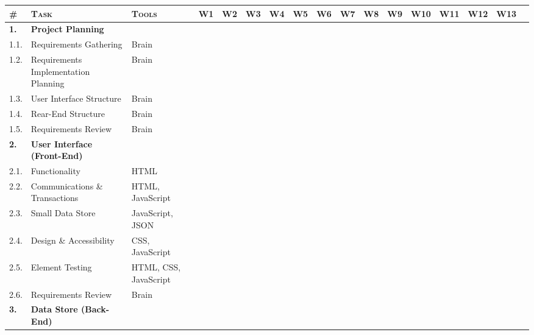 \documentclass[11pt, english]{article}
\begin{document}
\begin{landscape}

	\begin{table}[h]
		\tiny
		\renewcommand{\arraystretch}{1.25}
	\begin{center}
	\begin{tabular}{lll|cccccccccccccc}
		\textsc{\#} & \textsc{Task} & \textsc{Tools} & \textsc{W1} & \textsc{W2} & \textsc{W3} & \textsc{W4} & \textsc{W5} & \textsc{W6} & \textsc{W7} & \textsc{W8} & \textsc{W9} & \textsc{W10} & \textsc{W11} & \textsc{W12} & \textsc{W13}\\
		\hline
		\textbf{1.} & \textbf{Project Planning} &\\
		1.1. & Requirements Gathering & Brain & \cellcolor[gray]{0.1}\\ 
		1.2. & Requirements Implementation Planning & Brain & \cellcolor[gray]{0.1}\\
		1.3. & User Interface Structure & Brain & \cellcolor[gray]{0.1}\\
		1.4. & Rear-End Structure & Brain & \cellcolor[gray]{0.1}\\
		1.5. & Requirements Review & Brain & & \cellcolor[gray]{0.1}\\
		\hline
		\textbf{2.} & \textbf{User Interface (Front-End)} &\\
		2.1. & Functionality & HTML & & \cellcolor[gray]{0.1} & \cellcolor[gray]{0.1} & \cellcolor[gray]{0.1} & \cellcolor[gray]{0.1} & \cellcolor[gray]{0.1} & \cellcolor[gray]{0.1}\\
		2.2. & Communications \& Transactions & HTML, JavaScript & & \cellcolor[gray]{0.1} & \cellcolor[gray]{0.1} & \cellcolor[gray]{0.1} & \cellcolor[gray]{0.1} & \cellcolor[gray]{0.1} & \cellcolor[gray]{0.1}\\
		2.3. & Small Data Store & JavaScript, JSON & & \cellcolor[gray]{0.1} & \cellcolor[gray]{0.1} & \cellcolor[gray]{0.1} & \cellcolor[gray]{0.1} & \cellcolor[gray]{0.1} & \cellcolor[gray]{0.1}\\
		2.4. & Design \& Accessibility & CSS, JavaScript & & \cellcolor[gray]{0.1} & \cellcolor[gray]{0.1} & \cellcolor[gray]{0.1} & \cellcolor[gray]{0.1} & \cellcolor[gray]{0.1} & \cellcolor[gray]{0.1}\\
		2.5. & Element Testing & HTML, CSS, JavaScript & & & & & & \cellcolor[gray]{0.1} & \cellcolor[gray]{0.1}\\
		2.6. & Requirements Review & Brain & & & & & & & \cellcolor[gray]{0.1}\\
		\hline
		\textbf{3.} & \textbf{Data Store (Back-End)} &\\

\end{tabular}
\end{center}
\end{table}
\end{landscape}
\end{document}
